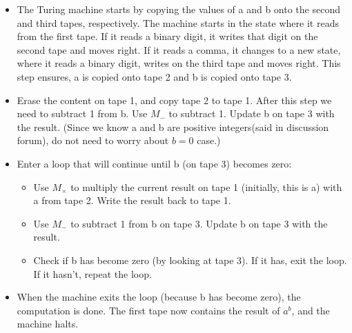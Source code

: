 \documentclass[12pt]{article}
\begin{document}
\begin{itemize}
    \item The Turing machine starts by copying the values of a and b onto the second and third tapes, respectively. The machine starts in the state where it reads from the first tape. If it reads a binary digit, it writes that digit on the second tape and moves right. If it reads a comma, it changes to a new state, where it reads a binary digit, writes on the third tape and moves right. This step ensures, a is copied onto tape 2 and b is copied onto tape 3.
    \item Erase the content on tape 1, and copy tape 2 to tape 1. After this step we need to subtract 1 from b. Use $M_-$ to subtract 1. Update b on tape 3 with the result. (Since we know a and b are positive integers(said in discussion forum), do not need to worry about $b=0$ case.)
    \item Enter a loop that will continue until b (on tape 3) becomes zero:
    \begin{itemize}
        \item Use $M_{\times}$ to multiply the current result on tape 1 (initially, this is a) with a from tape 2. Write the result back to tape 1.
        \item Use $M_-$ to subtract 1 from b on tape 3. Update b on tape 3 with the result.
        \item Check if b has become zero (by looking at tape 3). If it has, exit the loop. If it hasn't, repeat the loop.
    \end{itemize}
    \item When the machine exits the loop (because b has become zero), the computation is done. The first tape now contains the result of $a^b$, and the machine halts.
\end{itemize}
\end{document}
